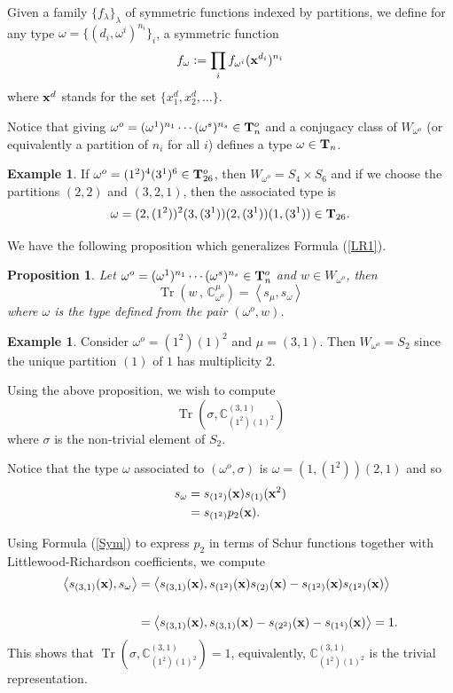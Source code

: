 \documentclass[11pt]{article}
\newtheorem{prop}[theo]{Proposition}
\theoremstyle{definition}
\newtheorem{exam}[theo]{Example}
\numberwithin{equation}{section}
\newcommand{\x}{{\bf x}}
\DeclareMathOperator{\Tr}{Tr} \DeclareMathOperator{\Ind}{Ind}
\begin{document}
Given a family $\{f_\lambda\}_\lambda$ of symmetric functions indexed by partitions, we define for any type $\omega=\{(d_i,\omega^i)^{n_i}\}_i$, a symmetric function
$$
f_\omega:=\prod_if_{\omega^i}(\x^{d_i})^{n_i}
$$
where $\x^d$ stands for the set $\{x_1^d,x_2^d,\dots\}$.


Notice that giving $\omega^o=(\omega^1)^{n_1}\cdots(\omega^s)^{n_s}\in{\bf T}^o_n$ and a conjugacy class of $W_{\omega^o}$ (or equivalently a partition of $n_i$ for all $i$) defines a type $\omega\in{\bf T}_n$.


\begin{exam} If $\omega^o=(1^2)^4(3^1)^6\in{\bf T}^o_{26}$, then $W_{\omega^o}=S_4\times S_6$ and if we choose the partitions $(2,2)$ and $(3,2,1)$, then the associated type is
	$$
	\omega=(2,(1^2))^2(3,(3^1))(2,(3^1))(1,(3^1))\in{\bf T}_{26}.
	$$
\end{exam}

We have the following proposition which generalizes Formula (\ref{LR1}).

\begin{prop}\cite[Proposition 6.2.5]{L2} Let $\omega^o=(\omega^1)^{n_1}\cdots(\omega^s)^{n_s}\in{\bf T}^o_n$ and $w\in W_{\omega^o}$, then
	$$
	\Tr\left(w\,,\, \mathbb{C}_{\omega^o}^\mu\right)=\left\langle s_\mu, s_\omega\right\rangle
	$$
	where $\omega$ is the type defined from the pair $(\omega^o,w)$.
	\label{Prop13}\end{prop}


\begin{exam}\label{ex} Consider $\omega^o=(1^2)(1)^2$ and $\mu=(3,1)$.  Then $W_{\omega^o}=S_2$ since the unique partition  $(1)$ of $1$ has multiplicity $2$.  
	
	Using the above proposition, we wish to compute
	$$
	\Tr\left(\sigma, \mathbb{C}^{(3,1)}_{(1^2)(1)^2}\right)
	$$
	where $\sigma$ is the non-trivial element of $S_2$. 
	
	
	Notice that the type $\omega$ associated to $(\omega^o,\sigma)$ is $\omega=(1,(1^2))(2,1)$ and so
	\begin{align*}
		s_\omega&=s_{(1^2)}(\x)s_{(1)}(\x^2)\\
		&=s_{(1^2)}p_2(\x).
	\end{align*}
	
	Using Formula (\ref{Sym}) to express $p_2$ in terms of Schur functions together with Littlewood-Richardson coefficients, we compute 
	\begin{align*}
		\left\langle s_{(3,1)}(\x),s_\omega\right\rangle&=\left\langle s_{(3,1)}(\x),s_{(1^2)}(\x)s_{(2)}(\x)-s_{(1^2)}(\x)s_{(1^2)}(\x) \right\rangle\\
		\\
		&= \left\langle s_{(3,1)}(\x),s_{(3,1)}(\x)-s_{(2^2)}(\x)-s_{(1^4)}(\x)\right\rangle=1.
	\end{align*}
	This shows that $\Tr\left(\sigma, \mathbb{C}^{(3,1)}_{(1^2)(1)^2}\right)=1$, equivalently,  $\mathbb{C}^{(3,1)}_{(1^2)(1)^2}$ is the trivial representation.
	
	
\end{exam}
\end{document}
